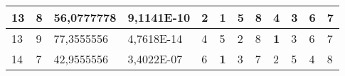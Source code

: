 \documentclass[conference]{IEEEtran}
\begin{document}
\begin{table*}[]
\begin{tabular}{|llll|llllllll|}
\multicolumn{1}{|l|}{13}                                                    & \multicolumn{1}{l|}{8}                                                        & \multicolumn{1}{l|}{56,0777778}                                                   & 9,1141E-10                     & \multicolumn{1}{l|}{2}                                                  & \multicolumn{1}{l|}{\textbf{1}}                                         & \multicolumn{1}{l|}{5}                                                  & \multicolumn{1}{l|}{8}                                                  & \multicolumn{1}{l|}{4}                                                  & \multicolumn{1}{l|}{3}                                                  & \multicolumn{1}{l|}{6}                                                  & 7                          \\ \hline
\multicolumn{1}{|l|}{13}                                                    & \multicolumn{1}{l|}{9}                                                        & \multicolumn{1}{l|}{77,3555556}                                                   & 4,7618E-14                     & \multicolumn{1}{l|}{4}                                                  & \multicolumn{1}{l|}{5}                                                  & \multicolumn{1}{l|}{2}                                                  & \multicolumn{1}{l|}{8}                                                  & \multicolumn{1}{l|}{\textbf{1}}                                         & \multicolumn{1}{l|}{3}                                                  & \multicolumn{1}{l|}{6}                                                  & 7                          \\ \hline
\multicolumn{1}{|l|}{14}                                                    & \multicolumn{1}{l|}{7}                                                        & \multicolumn{1}{l|}{42,9555556}                                                   & 3,4022E-07                     & \multicolumn{1}{l|}{6}                                                  & \multicolumn{1}{l|}{\textbf{1}}                                         & \multicolumn{1}{l|}{3}                                                  & \multicolumn{1}{l|}{7}                                                  & \multicolumn{1}{l|}{2}                                                  & \multicolumn{1}{l|}{5}                                                  & \multicolumn{1}{l|}{4}                                                  & 8                          \\ \hline

\end{tabular}
\end{table*}
\end{document}
